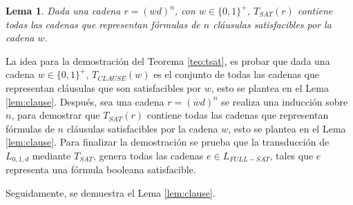 \documentclass[12pt]{article}
\newtheorem{lemma}{Lema}
\begin{document}
\begin{lemma}
    \label{lem:sat}
    Dada una cadena $r=(wd)^n$, con $w\in\{0,1\}^+$, $T_{SAT}(r)$ contiene todas las cadenas que representan fórmulas de $n$ cláusulas satisfacibles por la cadena $w$.
\end{lemma}

La idea para la demostración del Teorema \ref{teo:tsat}, es probar que dada una cadena $w\in \{0,1\}^+$, 
$T_{CLAUSE}(w)$ es el conjunto de todas las cadenas que representan cláusulas que son satisfacibles por $w$, 
esto se plantea en el Lema \ref{lem:clause}. Después, sea una cadena $r=(wd)^n$ se realiza una inducción 
sobre $n$, para demostrar que $T_{SAT}(r)$ contiene todas las cadenas que representan fórmulas de $n$
cláusulas satisfacibles por la cadena $w$, esto se plantea en el Lema \ref{lem:clause}.  
Para finalizar la demostración se prueba que la transducción de $L_{0,1,d}$ mediante $T_{SAT}$, 
genera todas las cadenas $e\in L_{FULL-SAT}$, tales que $e$ representa una fórmula booleana 
satisfacible.

Seguidamente, se demuestra el Lema \ref{lem:clause}.
\end{document}
